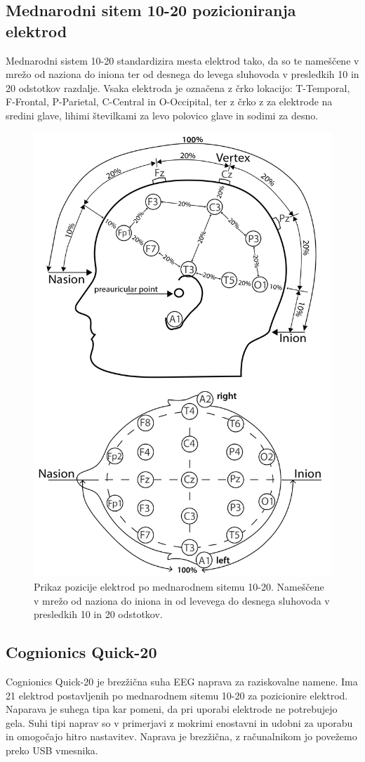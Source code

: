 \subsection{Mednarodni sitem 10-20 pozicioniranja elektrod}
Mednarodni sistem 10-20 standardizira mesta elektrod tako, da so te  nameščene v mrežo od naziona do iniona ter od desnega do levega sluhovoda v presledkih 10 in 20 odstotkov razdalje. Vsaka elektroda je označena z črko lokacijo: T-Temporal, F-Frontal, P-Parietal, C-Central in O-Occipital, ter z črko z za elektrode na sredini glave, lihimi številkami za levo polovico glave in sodimi za desno. \cite{klemTentwentyElectrodeSystem1999}
\begin{figure}[h!]
    \begin{center}
    \includegraphics[width=0.7\linewidth]{slike/1020-diagram1.jpg}
    \end{center}
    \caption{Prikaz pozicije elektrod po mednarodnem sitemu 10-20. Nameščene v mrežo od naziona do iniona in od levevega do desnega sluhovoda v presledkih 10 in 20 odstotkov. \cite{ElectrodeArrangementAccording}}
    \end{figure}


\subsection{Cognionics Quick-20}
Cognionics Quick-20 je brezžična suha EEG naprava za raziskovalne namene. Ima 21 elektrod postavljenih po mednarodnem sitemu 10-20 za pozicionire elektrod. Naparava je suhega tipa kar pomeni, da pri uporabi elektrode ne potrebujejo gela. Suhi tipi naprav so v primerjavi z mokrimi enostavni in udobni za uporabu in omogočajo hitro nastavitev. Naprava je brezžična, z računalnikom jo povežemo preko USB vmesnika. \cite{DryEEGHeadset}

